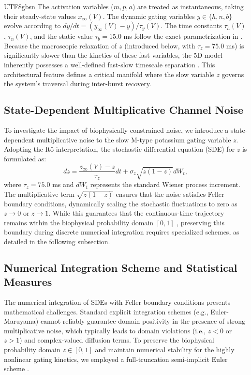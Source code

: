 ﻿\documentclass[reprint, amsmath, amssymb, aps, pre]{revtex4-2}
\begin{document}
\begin{CJK*}{UTF8}{gbsn}
The activation variables ($m, p, a$) are treated as instantaneous, taking their steady-state values $x_\infty(V)$. The dynamic gating variables $y \in \{h, n, b\}$ evolve according to $dy/dt = (y_\infty(V) - y)/\tau_y(V)$. The time constants $\tau_h(V)$, $\tau_n(V)$, and the static value $\tau_b = 15.0$ ms follow the exact parametrization in \cite{golomb2006contribution}. Because the macroscopic relaxation of $z$ (introduced below, with $\tau_z = 75.0$ ms) is significantly slower than the kinetics of these fast variables, the 5D model inherently possesses a well-defined fast-slow timescale separation \cite{kuehn2015multiple, wechselberger2020geometric}. This architectural feature defines a critical manifold where the slow variable $z$ governs the system's traversal during inter-burst recovery.

\subsection{State-Dependent Multiplicative Channel Noise}
To investigate the impact of biophysically constrained noise, we introduce a state-dependent multiplicative noise to the slow M-type potassium gating variable $z$. Adopting the Itô interpretation, the stochastic differential equation (SDE) for $z$ is formulated as:
\begin{equation}
dz = \frac{z_\infty(V) - z}{\tau_z} dt + \sigma_z \sqrt{z(1-z)} dW_t,
\label{eq:sde_z}
\end{equation}
where $\tau_z = 75.0$ ms and $dW_t$ represents the standard Wiener process increment. The multiplicative term $\sqrt{z(1-z)}$ ensures that the noise satisfies Feller boundary conditions, dynamically scaling the stochastic fluctuations to zero as $z \to 0$ or $z \to 1$. While this guarantees that the continuous-time trajectory remains within the biophysical probability domain $[0, 1]$ \cite{goldwyn2011what, yu2022effects}, preserving this boundary during discrete numerical integration requires specialized schemes, as detailed in the following subsection.

\subsection{Numerical Integration Scheme and Statistical Measures}
\label{sec:numerical}

The numerical integration of SDEs with Feller boundary conditions presents mathematical challenges. Standard explicit integration schemes (e.g., Euler-Maruyama) cannot reliably guarantee domain positivity in the presence of strong multiplicative noise, which typically leads to domain violations (i.e., $z < 0$ or $z > 1$) and complex-valued diffusion terms. To preserve the biophysical probability domain $z \in [0,1]$ and maintain numerical stability for the highly nonlinear gating kinetics, we employed a full-truncation semi-implicit Euler scheme \cite{higham2005convergence, lord2010comparison}.


\end{CJK*}
\end{document}
